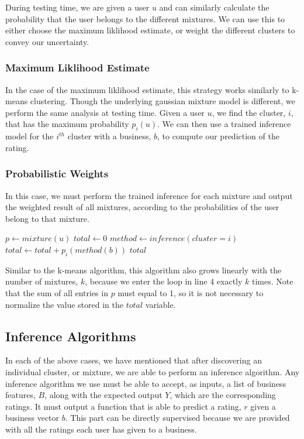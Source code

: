 \documentclass[11pt]{article}
\begin{document}
During testing time, we are given a user $u$ and can similarly calculate the probability that the user belongs to the different mixtures. We can use this to either choose the maximum liklihood estimate, or weight the different clusters to convey our uncertainty.


\subsubsection{Maximum Liklihood Estimate}
In the case of the maximum liklihood estimate, this strategy works similarly to k-means clustering. Though the underlying gaussian mixture model is different, we perform the same analysis at testing time. Given a user $u$, we find the cluster, $i$, that has the maximum probability $p_i(u)$. We can then use a trained inference model for the $i^{th}$ cluster with a business, $b$, to compute our prediction of the rating.

\subsubsection{Probabilistic Weights}
In this case, we must perform the trained inference for each mixture and output the weighted result of all mixtures, according to the probabilities of the user belong to that mixture.\\

\begin{algorithmic}[1]
\State $p \gets mixture(u)$ 
\State $total \gets 0$
 
\State $method \gets inference(cluster=i)$ 
\State $total \gets total + p_i(method(b))$
\EndFor
\State \Return $total$
\EndFunction
\end{algorithmic}
\medskip

Similar to the k-means algorithm, this algorithm also grows linearly with the number of mixtures, $k$, because we enter the loop in line 4 exactly $k$ times. Note that the sum of all entries in $p$ must equal to 1, so it is not necessary to normalize the value stored in the $total$ variable.

\subsection{Inference Algorithms}
In each of the above cases, we have mentioned that after discovering an individual cluster, or mixture, we are able to perform an inference algorithm. Any inference algorithm we use must be able to accept, as inputs, a list of business features, $B$, along with the expected output $Y$, which are the corresponding ratings. It must output a function that is able to predict a rating, $r$ given a business vector $b$. This part can be directly supervised because we are provided with all the ratings each user has given to a business.
\end{document}
